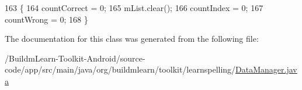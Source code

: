 \begin{DoxyCode}
163                         \{
164         countCorrect = 0;
165         mList.clear();
166         countIndex = 0;
167         countWrong = 0;
168     \}
\end{DoxyCode}


The documentation for this class was generated from the following file\-:\begin{DoxyCompactItemize}
\item 
/\-Buildm\-Learn-\/\-Toolkit-\/\-Android/source-\/code/app/src/main/java/org/buildmlearn/toolkit/learnspelling/\hyperlink{DataManager_8java}{Data\-Manager.\-java}\end{DoxyCompactItemize}
